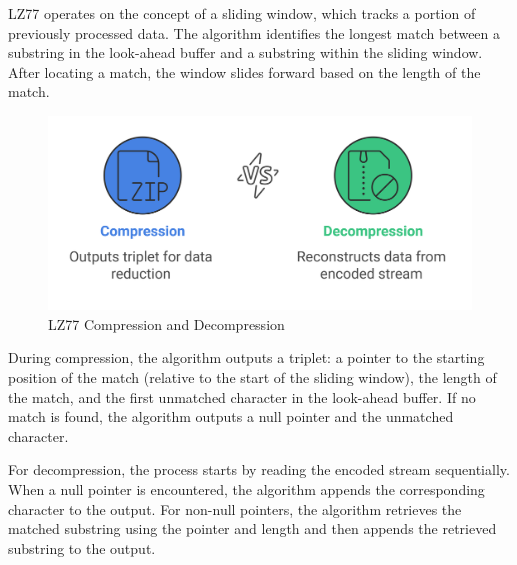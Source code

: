 LZ77\cite{doc4} operates on the concept of a sliding window, which tracks a portion of previously processed data. The algorithm identifies the longest match between a substring in the look-ahead buffer and a substring within the sliding window. After locating a match, the window slides forward based on the length of the match.

\begin{figure}[ht]
    \centering
    \includegraphics[width=0.8\linewidth]{Figures/LZ77.png}
    \caption{LZ77 Compression and Decompression}
    \label{fig:lz77}
\end{figure}

During compression, the algorithm outputs a triplet: a pointer to the starting position of the match (relative to the start of the sliding window), the length of the match, and the first unmatched character in the look-ahead buffer. If no match is found, the algorithm outputs a null pointer and the unmatched character.

\vspace{10pt}

For decompression, the process starts by reading the encoded stream sequentially. When a null pointer is encountered, the algorithm appends the corresponding character to the output. For non-null pointers, the algorithm retrieves the matched substring using the pointer and length and then appends the retrieved substring to the output.
